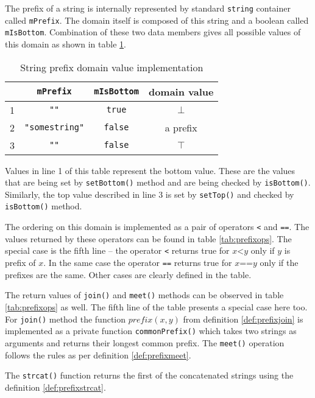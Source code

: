 \documentclass[12pt,final,oneside]{fithesis2}
\theoremstyle{definition}
\begin{document}
The prefix of a string is internally represented by standard \texttt{string}
container called \texttt{mPrefix}. The domain itself is composed of this string
and a boolean called \texttt{mIsBottom}. Combination of these two data members
gives all possible values of this domain as shown in table
\ref{tab:stringprefix}.

\begin{table}[ht]
\centering
\begin{tabular}{r|c|c|c}
  & \texttt{mPrefix}      & \texttt{mIsBottom} & domain value \\
\hline
1 & \texttt{""}           & \texttt{true}      & $\bot$ \\
2 & \texttt{"somestring"} & \texttt{false}     & a prefix \\
3 & \texttt{""}           & \texttt{false}     & $\top$
\end{tabular}
\caption{String prefix domain value implementation}
\label{tab:stringprefix}
\end{table}

Values in line 1 of this table represent the bottom value. These are the values
that are being set by \texttt{setBottom()} method and are being checked
by \texttt{isBottom()}. Similarly, the top value described in line 3 is set
by \texttt{setTop()} and checked by \texttt{isBottom()} method.

The ordering on this domain is implemented as a pair of operators \texttt{<}
and \texttt{==}. The values returned by these operators can be found in table
\ref{tab:prefixops}. The special case is the fifth line -- the operator
\texttt{<} returns true for $x \texttt{<} y$ only if $y$ is prefix of $x$.
In the same case the operator \texttt{==} returns true for $x \texttt{==} y$
only if the prefixes are the same. Other cases are clearly defined in the table. 

The return values of \texttt{join()} and \texttt{meet()} methods can be
observed in table \ref{tab:prefixops} as well. The fifth line of the table
presents a special case here too. For \texttt{join()} method the function
$\textit{prefix}(x, y)$ from definition \ref{def:prefixjoin} is implemented
as a private function \texttt{commonPrefix()} which takes two strings as
arguments and returns their longest common prefix. The \texttt{meet()}
operation follows the rules as per definition \ref{def:prefixmeet}.

The \texttt{strcat()} function returns the first of the concatenated strings
using the definition \ref{def:prefixstrcat}.
\end{document}
